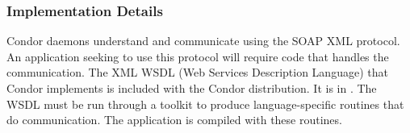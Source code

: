 
\subsubsection{\label{WebService-Implementation} Implementation Details}

Condor daemons understand and communicate using the
SOAP XML protocol.
An application seeking to use this protocol
will require code that handles the communication.
The XML WSDL (Web Services Description Language)
that Condor implements is included with the
Condor distribution.
It is in .
The WSDL must be run through a toolkit to produce
language-specific routines that do communication.
The application is compiled with these routines.

